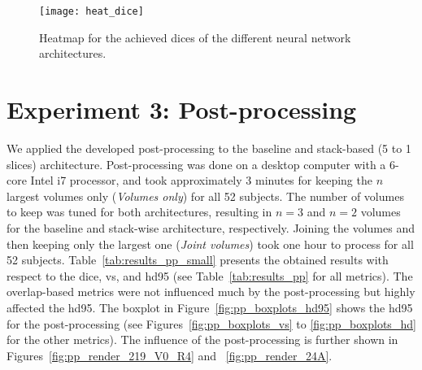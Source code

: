 \begin{figure}[htbp]	
	\centering
	\texttt{[image: heat\_dice]}
    \caption[Heatmap for the \acrlong{dice} for 3-D Context]{Heatmap for the achieved \acrlong{dice}s of the different neural network architectures.}
    \label{fig:results_heatmap_dice}
\end{figure}


\section{Experiment 3: Post-processing} \label{sec:exp_pp} %
We applied the developed post-processing to the baseline and stack-based (5 to 1 slices) architecture. Post-processing was done on a desktop computer with a 6-core Intel i7 processor, and took approximately 3 minutes for keeping the $n$ largest volumes only (\textit{Volumes only}) for all 52 subjects. The number of volumes to keep was tuned for both architectures, resulting in $n = 3$ and $n = 2$ volumes for the baseline and stack-wise architecture, respectively. Joining the volumes and then keeping only the largest one (\textit{Joint volumes}) took one hour to process for all 52 subjects. Table~\ref{tab:results_pp_small} presents the obtained results with respect to the \acrlong{dice}, \acrlong{vs}, and \acrlong{hd95} (see Table~\ref{tab:results_pp} for all metrics). The overlap-based metrics were not influenced much by the post-processing but highly affected the \gls{hd95}. The boxplot in Figure~\ref{fig:pp_boxplots_hd95} shows the \acrlong{hd95} for the post-processing (see Figures~\ref{fig:pp_boxplots_vs} to \ref{fig:pp_boxplots_hd} for the other metrics). The influence of the post-processing is further shown in Figures~\ref{fig:pp_render_219_V0_R4} and ~\ref{fig:pp_render_24A}.

